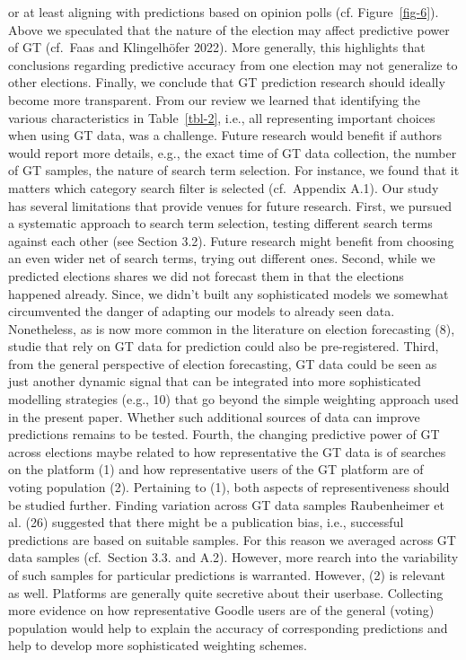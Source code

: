 \documentclass[
  letterpaper,
  DIV=11,
  numbers=noendperiod]{scrartcl}
\begin{document}
or at least aligning with predictions based on opinion polls (cf.
Figure~\ref{fig-6}). Above we speculated that the nature of the election
may affect predictive power of GT (cf.~Faas and Klingelhöfer 2022). More
generally, this highlights that conclusions regarding predictive
accuracy from one election may not generalize to other elections.
Finally, we conclude that GT prediction research should ideally become
more transparent. From our review we learned that identifying the
various characteristics in Table~\ref{tbl-2}, i.e., all representing
important choices when using GT data, was a challenge. Future research
would benefit if authors would report more details, e.g., the exact time
of GT data collection, the number of GT samples, the nature of search
term selection. For instance, we found that it matters which category
search filter is selected (cf.~Appendix A.1). Our study has several
limitations that provide venues for future research. First, we pursued a
systematic approach to search term selection, testing different search
terms against each other (see Section 3.2). Future research might
benefit from choosing an even wider net of search terms, trying out
different ones. Second, while we predicted elections shares we did not
forecast them in that the elections happened already. Since, we didn't
built any sophisticated models we somewhat circumvented the danger of
adapting our models to already seen data. Nonetheless, as is now more
common in the literature on election forecasting (8), studie that rely
on GT data for prediction could also be pre-registered. Third, from the
general perspective of election forecasting, GT data could be seen as
just another dynamic signal that can be integrated into more
sophisticated modelling strategies (e.g., 10) that go beyond the simple
weighting approach used in the present paper. Whether such additional
sources of data can improve predictions remains to be tested. Fourth,
the changing predictive power of GT across elections maybe related to
how representative the GT data is of searches on the platform (1) and
how representative users of the GT platform are of voting population
(2). Pertaining to (1), both aspects of representiveness should be
studied further. Finding variation across GT data samples Raubenheimer
et al. (26) suggested that there might be a publication bias, i.e.,
successful predictions are based on suitable samples. For this reason we
averaged across GT data samples (cf.~Section 3.3. and A.2). However,
more rearch into the variability of such samples for particular
predictions is warranted. However, (2) is relevant as well. Platforms
are generally quite secretive about their userbase. Collecting more
evidence on how representative Goodle users are of the general (voting)
population would help to explain the accuracy of corresponding
predictions and help to develop more sophisticated weighting schemes.
\end{document}
